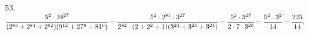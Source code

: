 53. $\cfrac{5^2\cdot24^{27}}{(2^{83}+2^{84}+2^{82})(9^{12}+27^8+81^{6})}=\cfrac{5^2\cdot2^{81}\cdot3^{27}}{2^{82}\cdot(2+2^2+1)(3^{24}+3^{24}+3^{24})}=
\cfrac{5^2\cdot3^{27}}{2\cdot7\cdot3^{25}}=\cfrac{5^2\cdot3^2}{14}=\cfrac{225}{14}.$\\
